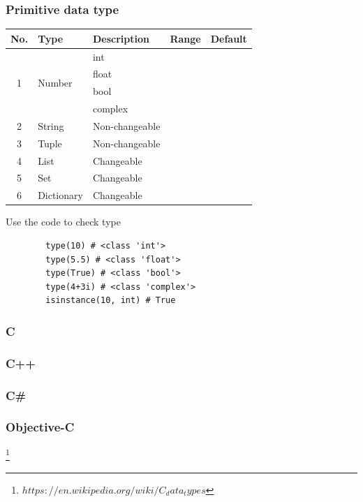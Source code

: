 \documentclass[12pt, a4paper]{report}
\begin{document}
        \subsubsection{Primitive data type}
        \begin{table}[H]
    	\centering
    	\begin{tabular}{c|l|l|c|c}
    	\toprule
    	No. & Type & Description & Range & Default \\
    	\hline
    	\multirow{4}{*}{1} & \multirow{4}{*}{Number} & int & &  \\
    	& & float & & \\
    	& & bool &  &\\
    	& & complex & & \\
    	\hline
    	2 & String & Non-changeable & & \\
    	\hline
    	3 & Tuple & Non-changeable & & \\
    	\hline
    	4 & List & Changeable & & \\
    	\hline
    	5 & Set & Changeable & & \\	
    	\hline
    	6 & Dictionary & Changeable & & \\
    	\bottomrule
    	\end{tabular}
    	\end{table}
    	Use the code to check type
    	\begin{lstlisting}
    	type(10) # <class 'int'>
    	type(5.5) # <class 'float'>
    	type(True) # <class 'bool'>
    	type(4+3i) # <class 'complex'>
    	isinstance(10, int) # True
    	\end{lstlisting}
    
	
	\subsubsection{C}
	\subsubsection{C++}
	\subsubsection{C\#}
	\subsubsection{Objective-C}
	\footnote{$https://en.wikipedia.org/wiki/C_data_types$}
	
	
\end{document}
